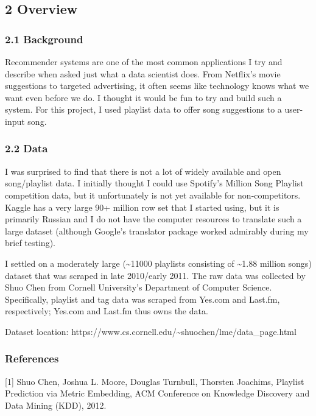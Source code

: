 \documentclass[11pt]{article}
\begin{document}
    \subsection{2 Overview}\label{overview}

    \subsubsection{2.1 Background}\label{background}

    Recommender systems are one of the most common applications I try and
describe when asked just what a data scientist does. From Netflix's
movie suggestions to targeted advertising, it often seems like
technology knows what we want even before we do. I thought it would be
fun to try and build such a system. For this project, I used playlist
data to offer song suggestions to a user-input song.

    \subsubsection{2.2 Data}\label{data}

    I was surprised to find that there is not a lot of widely available and
open song/playlist data. I initially thought I could use Spotify's
Million Song Playlist competition data, but it unfortunately is not yet
available for non-competitors. Kaggle has a very large 90+ million row
set that I started using, but it is primarily Russian and I do not have
the computer resources to translate such a large dataset (although
Google's translator package worked admirably during my brief testing).

I settled on a moderately large (\textasciitilde{}11000 playlists
consisting of \textasciitilde{}1.88 million songs) dataset that was
scraped in late 2010/early 2011. The raw data was collected by Shuo Chen
from Cornell University's Department of Computer Science. Specifically,
playlist and tag data was scraped from Yes.com and Last.fm,
respectively; Yes.com and Last.fm thus owns the data.

Dataset location:
https://www.cs.cornell.edu/\textasciitilde{}shuochen/lme/data\_page.html

\subsubsection{References}\label{references}

{[}1{]} Shuo Chen, Joshua L. Moore, Douglas Turnbull, Thorsten Joachims,
Playlist Prediction via Metric Embedding, ACM Conference on Knowledge
Discovery and Data Mining (KDD), 2012.
\end{document}
